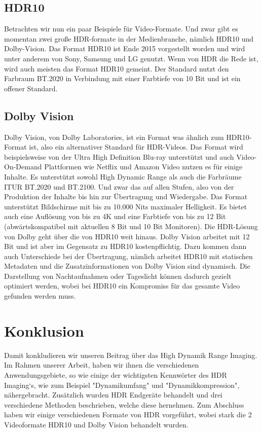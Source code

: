 \documentclass[conference]{IEEEtran}
\begin{document}
\subsection{HDR10}
Betrachten wir nun ein paar Beispiele für Video-Formate. Und zwar gibt es momentan zwei große HDR-formate in der Medienbranche, nämlich HDR10 und Dolby-Vision.
Das Format HDR10 ist Ende 2015 vorgestellt worden und wird unter anderem von Sony, Samsung und LG genutzt. Wenn von HDR die Rede ist, wird auch meisten das Format HDR10 gemeint. Der Standard nutzt den Farbraum BT.2020 in Verbindung mit einer Farbtiefe von 10 Bit und ist ein offener Standard.
\subsection{Dolby Vision}
Dolby Vision, von Dolby Laboratories, ist ein Format was ähnlich zum HDR10-Format ist, also ein alternativer Standard für HDR-Videos. Das Format wird beispielsweise von der Ultra High Definition Blu-ray unterstützt und auch Video-On-Demand Plattformen wie Netflix und Amazon Video nutzen es für einige Inhalte. Es unterstützt sowohl High Dynamic Range als auch die Farbräume ITUR BT.2020 und BT.2100. Und zwar das auf allen Stufen, also von der Produktion der Inhalte bis hin zur Übertragung und Wiedergabe. Das Format unterstützt Bildschirme mit bis zu 10.000 Nits maximaler Helligkeit. Es bietet auch eine Auflösung von bis zu 4K und eine Farbtiefe von bis zu 12 Bit (abwärtskompatibel mit aktuellen 8 Bit und 10 Bit Monitoren). Die HDR-Lösung von Dolby geht über die von HDR10 weit hinaus. Dolby Vision arbeitet mit 12 Bit und ist aber im Gegensatz zu HDR10 kostenpflichtig. Dazu kommen dann auch Unterschiede bei der Übertragung, nämlich arbeitet HDR10 mit statischen Metadaten und die Zusatzinformationen von Dolby Vision sind dynamisch. Die Darstellung von Nachtaufnahmen oder Tageslicht können dadurch gezielt optimiert werden, wobei bei HDR10 ein Kompromiss für das gesamte Video gefunden werden muss.
\section*{Konklusion}
Damit konkludieren wir unseren Beitrag über das High Dynamik Range Imaging. Im Rahmen unserer Arbeit, haben wir ihnen die verschiedenen Anwendungsgebiete, so wie einige der wichtigsten Kennwörter des HDR Imaging‘s, wie zum Beispiel "Dynamikumfang" und "Dynamikkompression", nähergebracht. Zusätzlich wurden HDR Endgeräte behandelt und drei verschiedene Methoden beschrieben, welche diese hernehmen. Zum Abschluss haben wir einige verschiedenen Formate von HDR vorgeführt, wobei stark die 2 Videoformate HDR10 und Dolby Vision behandelt wurden.

\nocite{*}


\listoffigures
\end{document}
